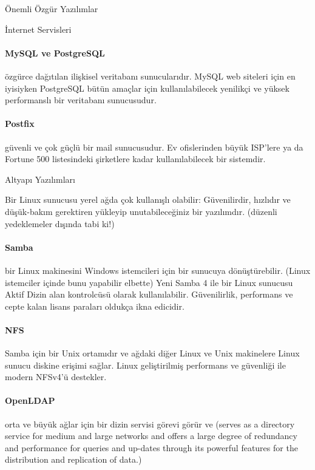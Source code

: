 \begin{section}{Önemli Özgür Yazılımlar}
\begin{subsection}{İnternet Servisleri}
\paragraph{MySQL ve PostgreSQL}{özgürce dağıtılan ilişkisel veritabanı sunucularıdır. MySQL web siteleri için en iyisiyken PostgreSQL bütün amaçlar için kullanılabilecek yenilikçi ve yüksek performanslı bir veritabanı sunucusudur.}
\paragraph{Postfix}{güvenli ve çok güçlü bir mail sunucusudur. Ev ofislerinden büyük ISP'lere ya da Fortune 500 listesindeki şirketlere kadar kullanılabilecek bir sistemdir.}
\end{subsection}
\begin{subsection}{Altyapı Yazılımları}

Bir Linux sunucusu yerel ağda çok kullanışlı olabilir: Güvenilirdir, hızlıdır ve düşük-bakım gerektiren yükleyip unutabileceğiniz bir yazılımdır. (düzenli yedeklemeler dışında tabi ki!)
\paragraph{Samba}{bir Linux makinesini Windows istemcileri için bir sunucuya dönüştürebilir. (Linux istemciler içinde bunu yapabilir elbette) Yeni Samba 4 ile bir Linux sunucusu Aktif Dizin alan kontrolcüsü olarak kullanılabilir. Güvenilirlik, performans ve cepte kalan lisans paraları oldukça ikna edicidir.}
\paragraph{NFS}{Samba için bir Unix ortamıdır ve ağdaki diğer Linux ve Unix makinelere Linux sunucu diskine erişimi sağlar. Linux geliştirilmiş performans ve güvenliği ile modern NFSv4'ü destekler.}
\paragraph{OpenLDAP}{orta ve büyük ağlar için bir dizin servisi görevi görür ve (serves as a directory service for medium and large networks and offers a large degree of redundancy and performance for queries and up-dates through its powerful features for the distribution and replication of data.)}

\end{subsection}
\end{section}
